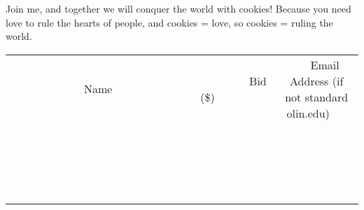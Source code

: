 \documentclass[11pt]{article}
\begin{document}
Join me, and together we will conquer the world with cookies!  Because you need love to rule the hearts of people, and cookies = love, so cookies = ruling the world.
\\[3ex]
\begin{tabular}{c c c}
~~~~~~~~~~~~~Name~~~~~~~~~~~~~ & ~~~~~~~~~Bid (\$)~~~~~~~~~  & ~~~Email Address (if not standard olin.edu)~~~\\
 & & \\
\hline
 & & \\
\hline
 & & \\
\hline
 & & \\
\hline
 & & \\
\hline
 & & \\
\hline
 & & \\
\hline
 & & \\
\hline
 & & \\
\hline
 & & \\
\hline
 & & \\
\hline
 & & \\
\hline
 & & \\
\hline
 & & \\
\hline
 & & \\
\hline
 & & \\
\hline
 & & \\
\hline
 & & \\
\hline
 & & \\
\hline
\end{tabular}
\newpage
\end{document}
